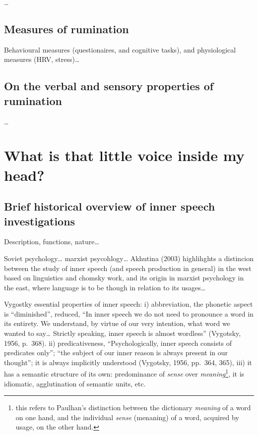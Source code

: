 \documentclass[a4paper,12pt,twoside,openright,oldfontcommands]{memoir}
\let\rmarkdownfootnote\footnote%
\def\footnote{\protect\rmarkdownfootnote}
\begin{document}
\ldots{}

\hypertarget{measures-of-rumination}{%
\subsection{Measures of rumination}\label{measures-of-rumination}}

Behavioural measures (questionaires, and cognitive tasks), and physiological measures (HRV, stress)\ldots{}

\hypertarget{on-the-verbal-and-sensory-properties-of-rumination}{%
\subsection{On the verbal and sensory properties of rumination}\label{on-the-verbal-and-sensory-properties-of-rumination}}

\ldots{}

\hypertarget{what-is-that-little-voice-inside-my-head}{%
\section{What is that little voice inside my head?}\label{what-is-that-little-voice-inside-my-head}}

\hypertarget{brief-historical-overview-of-inner-speech-investigations}{%
\subsection{Brief historical overview of inner speech investigations}\label{brief-historical-overview-of-inner-speech-investigations}}

Description, functions, nature\ldots{}

Soviet psychology\ldots{} marxist psycohlogy\ldots{} Akhutina (2003) highlihghts a distincion between the study of inner speech (and speech production in general) in the west based on linguistics and chomsky work, and its origin in marxist psychology in the east, where language is to be though in relation to its usages\ldots{}

Vygostky essential properties of inner speech: i) abbreviation, the phonetic aspect is \enquote{diminished}, reduced, \enquote{In inner speech we do not need to pronounce a word in its entirety. We understand, by virtue of our very intention, what word we wanted to say\ldots{} Strictly speaking, inner speech is almost wordless} (Vygotsky, 1956, p.~368). ii) predicativeness, \enquote{Psychologically, inner speech consists of predicates only}; \enquote{the subject of our inner reason is always present in our thought}; it is always implicitly understood (Vygotsky, 1956, pp.~364, 365), iii) it has a semantic structure of its own: predominance of \emph{sense} over \emph{meaning}\footnote{this refers to Paulhan's distinction between the dictionary \emph{meaning} of a word on one hand, and the individual \emph{sense} (menaning) of a word, acquired by usage, on the other hand.}, it is idiomatic, agglutination of semantic units, etc.
\end{document}

